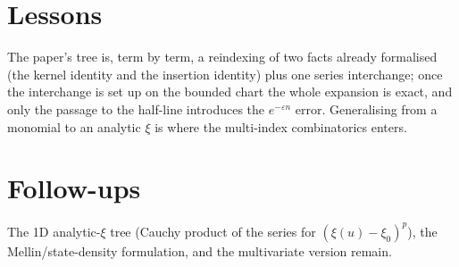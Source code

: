 \documentclass[11pt]{article}
\begin{document}
\section{Lessons}
The paper's tree is, term by term, a reindexing of two facts already formalised (the kernel identity and
the insertion identity) plus one series interchange; once the interchange is set up on the bounded chart
the whole expansion is exact, and only the passage to the half-line introduces the $e^{-\varepsilon n}$
error. Generalising from a monomial to an analytic $\xi$ is where the multi-index combinatorics enters.

\section{Follow-ups}
The 1D analytic-$\xi$ tree (Cauchy product of the series for $(\xi(u)-\xi_0)^p$), the Mellin/state-density
formulation, and the multivariate version remain.
\end{document}
